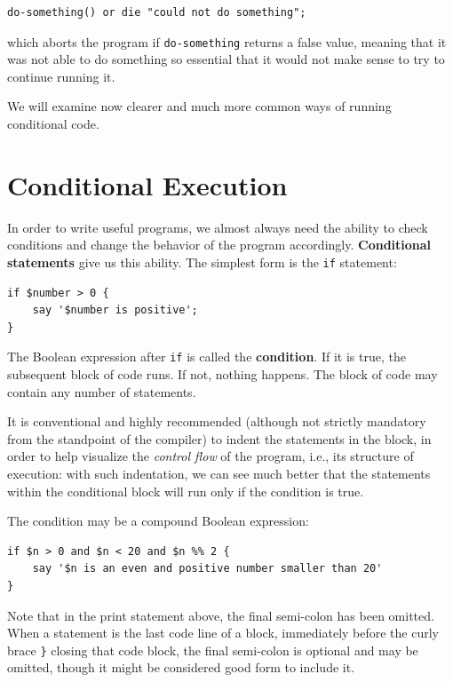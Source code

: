 \begin{verbatim}
do-something() or die "could not do something";
\end{verbatim}
%
which aborts the program if {\tt do-something} returns a false 
value, meaning that it was not able to do something 
so essential that it would not make sense to try to continue 
running it.

We will examine now clearer and much more common 
ways of running conditional code.


\section{Conditional Execution}
\label{conditional.execution}

In order to write useful programs, we almost always need the ability
to check conditions and change the behavior of the program
accordingly.  {\bf Conditional statements} give us this ability.  The
simplest form is the {\tt if} statement:

\begin{verbatim}
if $number > 0 {
    say '$number is positive';
}
\end{verbatim}
%
The Boolean expression after {\tt if} is called the 
{\bf condition}.  If it is true, the subsequent 
block of code runs.  If not, nothing happens. The block of 
code may contain any number of statements.

It is conventional and highly recommended (although not 
strictly mandatory from the standpoint of the compiler) 
to indent the statements in the block, in order to help 
visualize the \emph{control flow} of the program, i.e., 
its structure of execution: with such indentation, we 
can see much better that the statements within the 
conditional block will run only if the condition is true.

The condition may be a compound Boolean expression:
\begin{verbatim}
if $n > 0 and $n < 20 and $n %% 2 {
    say '$n is an even and positive number smaller than 20'
}
\end{verbatim}
%
Note that in the print statement above, the final semi-colon 
has been omitted. When a statement is the last code line of 
a block, immediately before the curly brace {\tt \}} closing 
that code block, the final semi-colon is optional and may 
be omitted, though it might be considered good form to include it.

